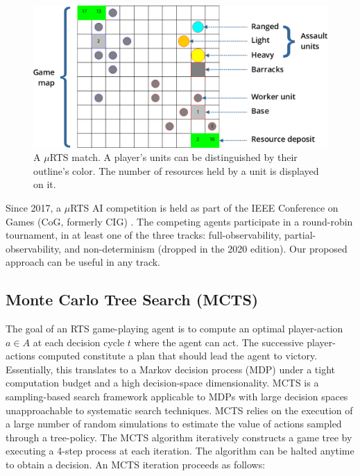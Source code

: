 \documentclass[conference]{IEEEtran}
\newcommand{\mRTS}{$\mu$RTS}
\newcommand{\squeezeup}{\vspace{-2.0mm}}
\begin{document}

\begin{figure}[t]
\begin{center}
	\includegraphics[scale=1]{figs/mRTS.png}
	\caption{A \mRTS{} match. A player's units can be distinguished by their outline's color. The number of resources held by a unit is displayed on it.}
	\label{mRTSScreenshot}
\end{center}
\squeezeup
\squeezeup
\end{figure}

Since 2017, a \mRTS{} AI competition is held as part of the IEEE Conference on Games (CoG, formerly CIG) \cite{ontanon_first_2018}. The competing agents participate in a round-robin tournament, in at least one of the three tracks: full-observability, partial-observability, and non-determinism (dropped in the 2020 edition). Our proposed approach can be useful in any track.



\subsection{Monte Carlo Tree Search (MCTS)}

The goal of an RTS game-playing agent is to compute an optimal player-action $a \in A$ at each decision cycle $t$ where the agent can act. The successive player-actions computed constitute a plan that should lead the agent to victory. Essentially, this translates to a Markov decision process (MDP) under a tight computation budget and a high decision-space dimensionality. MCTS is a sampling-based search framework applicable to MDPs with large decision spaces unapproachable to systematic search techniques. MCTS relies on the execution of a large number of random simulations to estimate the value of actions sampled through a tree-policy. The MCTS algorithm iteratively constructs a game tree by executing a 4-step process at each iteration. The algorithm can be halted anytime to obtain a decision. An MCTS iteration proceeds as follows:
\end{document}
